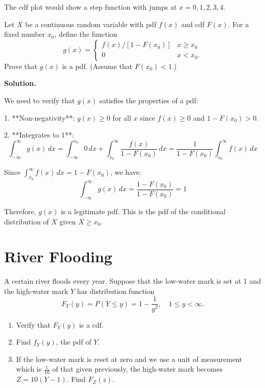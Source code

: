 The cdf plot would show a step function with jumps at $x = 0, 1, 2, 3, 4$.


\begin{problembox}
Let $X$ be a continuous random variable with pdf $f(x)$ and cdf $F(x)$. For a fixed number $x_{0}$, define the function
\[ g(x)=\left\{\begin{array}{ll}
f(x)/[1-F(x_{0})] & x\geq x_{0}\\
0 & x<x_{0}.
\end{array}\right. \]
Prove that $g(x)$ is a pdf. (Assume that $F(x_{0})<1$.)
\end{problembox}

\noindent\textbf{Solution.}

We need to verify that $g(x)$ satisfies the properties of a pdf:

1. **Non-negativity**: $g(x) \geq 0$ for all $x$ since $f(x) \geq 0$ and $1 - F(x_0) > 0$.

2. **Integrates to 1**:
   \[ \int_{-\infty}^{\infty} g(x) \, dx = \int_{-\infty}^{x_0} 0 \, dx + \int_{x_0}^{\infty} \frac{f(x)}{1 - F(x_0)} \, dx = \frac{1}{1 - F(x_0)} \int_{x_0}^{\infty} f(x) \, dx \]
   
   Since $\int_{x_0}^{\infty} f(x) \, dx = 1 - F(x_0)$, we have:
   \[ \int_{-\infty}^{\infty} g(x) \, dx = \frac{1 - F(x_0)}{1 - F(x_0)} = 1 \]

Therefore, $g(x)$ is a legitimate pdf. This is the pdf of the conditional distribution of $X$ given $X \geq x_0$.


\section{River Flooding}

\begin{problembox}
A certain river floods every year. Suppose that the low-water mark is set at 1 and the high-water mark $Y$ has distribution function
\[ F_Y(y) = P(Y \leq y) = 1 - \frac{1}{y^2}, \quad 1 \leq y < \infty. \]
\begin{enumerate}[label=(\alph*)]
    \item Verify that $F_Y(y)$ is a cdf.
    \item Find $f_Y(y)$, the pdf of $Y$.
    \item If the low-water mark is reset at zero and we use a unit of measurement which is $\frac{1}{10}$ of that given previously, the high-water mark becomes $Z = 10(Y - 1)$. Find $F_Z(z)$.
\end{enumerate}
\end{problembox}

